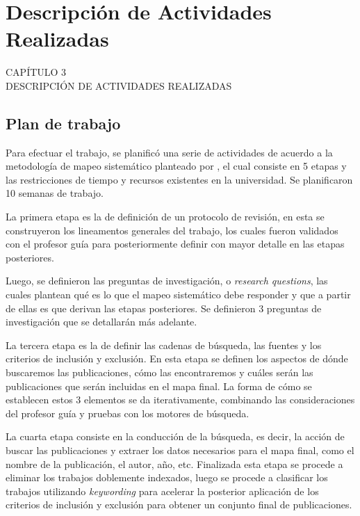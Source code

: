 {
\Hide
\chapter{Descripción de Actividades Realizadas}
}

\begin{titular} 
	\uppercase{
	capítulo 3 \\
	Descripción de Actividades Realizadas \\
	}
\end{titular}

\section{Plan de trabajo}

Para efectuar el trabajo, se planificó una serie de actividades
de acuerdo a la metodología de mapeo sistemático planteado por \cite{Petersen2007}, el cual
consiste en 5 etapas y las restricciones de tiempo y recursos existentes
en la universidad. Se planificaron 10 semanas de trabajo.

La primera etapa es la de definición de un protocolo de revisión, en esta se 
construyeron los lineamentos generales del trabajo, los cuales fueron 
validados con el profesor guía para posteriormente definir con mayor detalle
en las etapas posteriores.

Luego, se definieron las preguntas de investigación, o \textit{research questions}, las
cuales plantean qué es lo que el mapeo sistemático debe responder y que a partir
de ellas es que derivan las etapas posteriores. Se definieron 3 preguntas de investigación
que se detallarán más adelante.

La tercera etapa es la de definir las cadenas de búsqueda, las fuentes y los criterios
de inclusión y exclusión. En esta etapa se definen los aspectos de dónde buscaremos
las publicaciones, cómo las encontraremos y cuáles serán las publicaciones que
serán incluidas en el mapa final. La forma de cómo se establecen estos 3 elementos
se da iterativamente, combinando las consideraciones del profesor guía y pruebas
con los motores de búsqueda.

La cuarta etapa consiste en la conducción de la búsqueda, es decir, la acción de
buscar las publicaciones y extraer los datos necesarios para el mapa final, como el 
nombre de la publicación, el autor, año, etc. Finalizada esta etapa se procede a 
eliminar los trabajos doblemente indexados, luego se procede a clasificar los trabajos
utilizando \textit{keywording} para acelerar la posterior aplicación de los criterios de 
inclusión y exclusión para obtener un conjunto final de publicaciones.

